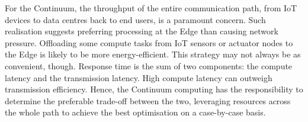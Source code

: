 For the Continuum, the throughput of the entire communication path, from IoT devices to data centres back to end users, is a paramount concern. Such realisation suggests preferring processing at the Edge than causing network pressure. 
Offloading some compute tasks from IoT sensors or actuator nodes to the Edge is likely to be more energy-efficient. 
This strategy may not always be as convenient, though. 
Response time is the sum of two components: the compute latency and the transmission latency. High compute latency can outweigh transmission efficiency. 
Hence, the Continuum computing has the responsibility to determine the preferable trade-off between the two, leveraging resources across the whole path to achieve the best optimisation on a case-by-case basis.


